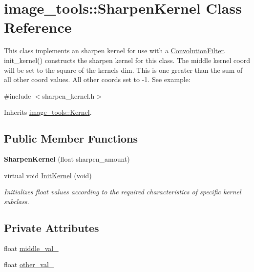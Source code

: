 \hypertarget{classimage__tools_1_1SharpenKernel}{}\section{image\+\_\+tools\+:\+:Sharpen\+Kernel Class Reference}
\label{classimage__tools_1_1SharpenKernel}


This class implements an sharpen kernel for use with a \hyperlink{classimage__tools_1_1ConvolutionFilter}{Convolution\+Filter}. init\+\_\+kernel() constructs the sharpen kernel for this class. The middle kernel coord will be set to the square of the kernel\textquotesingle{}s dim. This is one greater than the sum of all other coord values. All other coords set to -\/1. See example\+:  




{\ttfamily \#include $<$sharpen\+\_\+kernel.\+h$>$}



Inherits \hyperlink{classimage__tools_1_1Kernel}{image\+\_\+tools\+::\+Kernel}.

\subsection*{Public Member Functions}
\begin{DoxyCompactItemize}
\item 
{\bfseries Sharpen\+Kernel} (float sharpen\+\_\+amount)\hypertarget{classimage__tools_1_1SharpenKernel_a4724f3d5ccd00013a9afe92c1d4b9944}{}\label{classimage__tools_1_1SharpenKernel_a4724f3d5ccd00013a9afe92c1d4b9944}

\item 
virtual void \hyperlink{classimage__tools_1_1SharpenKernel_a3a9a001ae2c85277ef658cfdc7046a4b}{Init\+Kernel} (void)\hypertarget{classimage__tools_1_1SharpenKernel_a3a9a001ae2c85277ef658cfdc7046a4b}{}\label{classimage__tools_1_1SharpenKernel_a3a9a001ae2c85277ef658cfdc7046a4b}

\begin{DoxyCompactList}\small\item\em Initializes float values according to the required characteristics of specific kernel subclass. \end{DoxyCompactList}\end{DoxyCompactItemize}
\subsection*{Private Attributes}
\begin{DoxyCompactItemize}
\item 
float \hyperlink{classimage__tools_1_1SharpenKernel_ad9221cccfe79053e95ba227de19413ac}{middle\+\_\+val\+\_\+}
\item 
float \hyperlink{classimage__tools_1_1SharpenKernel_a12daec6c34459fc770e4d8310e9f7475}{other\+\_\+val\+\_\+}
\end{DoxyCompactItemize}
